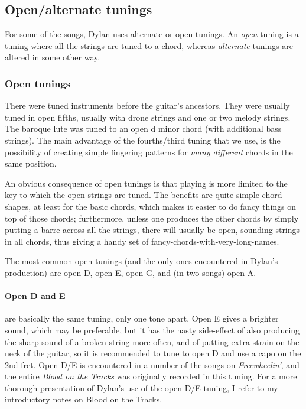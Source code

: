 \begin{articlelayout}
\subsection*{Open/alternate tunings}

For some of the songs, Dylan uses alternate or open tunings. An \emph{open}
tuning is a tuning where all the strings are tuned to a chord, whereas
\emph{alternate} tunings are altered in some other way.

\subsubsection*{Open tunings}

There were tuned instruments before the guitar's ancestors. They were
usually tuned in open fifths, usually with drone strings and one or
two melody strings. The baroque lute was tuned to an open d minor
chord (with additional bass strings). The main advantage of the
fourths/third tuning that we use, is the possibility of creating
simple fingering patterns for \emph{many different} chords in the same
position.

An obvious consequence of open tunings is that playing is more limited
to the key to which the open strings are tuned. The benefits are quite
simple chord shapes, at least for the basic chords, which makes it
easier to do fancy things on top of those chords; furthermore, unless
one produces the other chords by simply putting a barre across all the
strings, there will usually be open, sounding strings in all chords,
thus giving a handy set of fancy-chords-with-very-long-names.

The most common open tunings (and the only ones encountered in Dylan's
production) are open D, open E, open G, and (in two songs) open A.

\paragraph*{Open D and E}
are basically the same tuning, only one tone
apart. Open E gives a brighter sound, which may be preferable, but it
has the nasty side-effect of also producing the sharp sound of a
broken string more often, and of putting extra strain on the neck of
the guitar, so it is recommended to tune to open D and use a capo on
the 2nd fret. Open D/E is encountered in a number of the songs on
\emph{Freewheelin'}, and the entire \emph{Blood on the Tracks} was
originally recorded in this tuning. For a more thorough presentation
of Dylan's use of the open D/E tuning, I refer to my introductory
notes on Blood on the Tracks.


\end{articlelayout}
